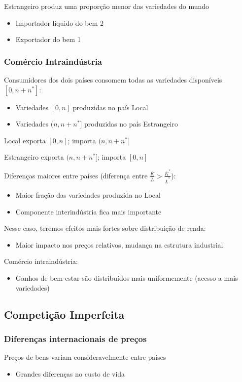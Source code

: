 \documentclass[a4paper,12pt]{article}[abntex2]
\begin{document}
Estrangeiro produz uma proporção menor das variedades do mundo
\begin{itemize}
  \item Importador líquido do bem 2
  \item Exportador do bem 1
\end{itemize}


\subsubsection{\textbf{Comércio Intraindústria}}
Consumidores dos dois países consomem todas as variedades disponíveis $[0, n + n^*]$:
\begin{itemize}
  \item Variedades $[0, n]$ produzidas no país Local
  \item Variedades $(n, n + n^*]$ produzidas no país Estrangeiro
\end{itemize}


Local exporta $[0, n]$; importa $(n, n + n^*]$

Estrangeiro exporta $(n, n + n^*]$; importa $[0, n]$


Diferenças maiores entre países (diferença entre $\frac{\bar{K}}{\bar{L}} > \frac{\bar{K}^*}{\bar{L}^*}$):
\begin{itemize}
  \item Maior fração das variedades produzida no Local
  \item Componente interindústria fica mais importante
\end{itemize}

Nesse caso, teremos efeitos mais fortes sobre distribuição de renda:
\begin{itemize}
  \item Maior impacto nos preços relativos, mudança na estrutura industrial
\end{itemize}

Comércio intraindústria:
\begin{itemize}
  \item Ganhos de bem-estar são distribuídos mais uniformemente (acesso a mais variedades)
\end{itemize}

\subsection{\textbf{Competição Imperfeita}}
\subsubsection{\textbf{Diferenças internacionais de preços}}
Preços de bens variam consideravelmente entre países
\begin{itemize}
  \item Grandes diferenças no custo de vida
\end{itemize}
\end{document}
